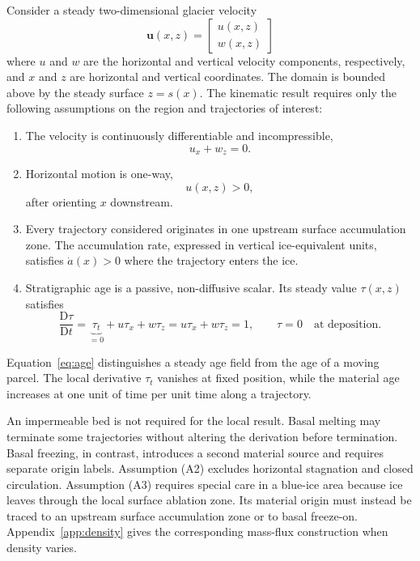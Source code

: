 \documentclass[review]{igs}
\theoremstyle{definition}
\theoremstyle{remark}
\newcommand{\uvec}{\bm{u}}
\begin{document}
Consider a steady two-dimensional glacier velocity
\begin{equation}
\uvec(x,z)
=
\begin{bmatrix}
u(x,z) \\
w(x,z)
\end{bmatrix}
\end{equation}
where \(u\) and \(w\) are the horizontal and vertical velocity components, respectively, and \(x\) and \(z\) are horizontal and vertical coordinates. The domain is bounded above by the steady surface \(z=s(x)\). The kinematic result requires only the following assumptions on the region and trajectories of interest:

\begin{enumerate}[leftmargin=*,label=(A\arabic*)]
  \item The velocity is continuously differentiable and incompressible,
  \begin{equation}
  u_x+w_z=0.
  \label{eq:incompressible}
  \end{equation}
  \item Horizontal motion is one-way,
  \begin{equation}
  u(x,z)>0,
  \label{eq:oneway}
  \end{equation}
  after orienting \(x\) downstream.
  \item Every trajectory considered originates in one upstream surface accumulation zone. The accumulation rate, expressed in vertical ice-equivalent units, satisfies \(\dot a(x)>0\) where the trajectory enters the ice.
  \item Stratigraphic age is a passive, non-diffusive scalar. Its steady value \(\tau(x,z)\) satisfies
  \begin{equation}
  \frac{\mathrm{D}\tau}{\mathrm{D}t}
  =\underbrace{\tau_t}_{=0}+u\tau_x+w\tau_z
  =u\tau_x+w\tau_z
  =1,
  \qquad \tau=0\quad\text{at deposition}.
  \label{eq:age}
  \end{equation}
\end{enumerate}

Equation~\eqref{eq:age} distinguishes a steady age field from the age of a moving parcel. The local derivative \(\tau_t\) vanishes at fixed position, while the material age increases at one unit of time per unit time along a trajectory.

An impermeable bed is not required for the local result. Basal melting may terminate some trajectories without altering the derivation before termination. Basal freezing, in contrast, introduces a second material source and requires separate origin labels. Assumption (A2) excludes horizontal stagnation and closed circulation. Assumption (A3) requires special care in a blue-ice area because ice leaves through the local surface ablation zone. Its material origin must instead be traced to an upstream surface accumulation zone or to basal freeze-on. Appendix~\ref{app:density} gives the corresponding mass-flux construction when density varies.
\end{document}
